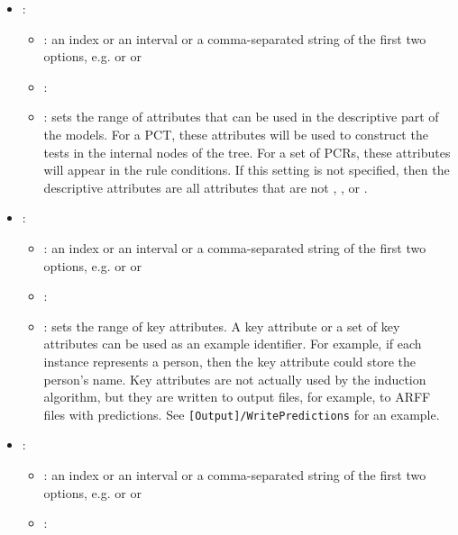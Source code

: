 \begin{itemize}
    \item {}:
           \begin{itemize}
                \item \optionPossibleValues{}: an index or an interval or a comma-separated string of the first two options, e.g.  or  or 
                \item \optionDefaultValue{}: 
                \item \optionDescrption{}: sets the range of attributes that can be used in the descriptive part of the models. For a PCT, these attributes will be used to construct the tests in the internal nodes of the tree. For a set of PCRs, these attributes will appear in the rule conditions. If this setting is not specified, then the descriptive attributes are all attributes that are not , , or .
           \end{itemize}
    \item {}:
           \begin{itemize}
                \item \optionPossibleValues{}: an index or an interval or a comma-separated string of the first two options, e.g.  or  or 
                \item \optionDefaultValue{}: 
                \item \optionDescrption{}: sets the range of key attributes. A key attribute or a set of key attributes can be used as an example identifier. For example, if each instance represents a person, then the key attribute could store the person's name.
                Key attributes are not actually used by the induction algorithm, but they are written to output files, for example, to ARFF files with predictions. See \texttt{[Output]/WritePredictions} for an example.
           \end{itemize}
    \item {}:
           \begin{itemize}
                \item \optionPossibleValues{}: an index or an interval or a comma-separated string of the first two options, e.g.  or  or 
                \item \optionDefaultValue{}: 

\end{itemize}
\end{itemize}
